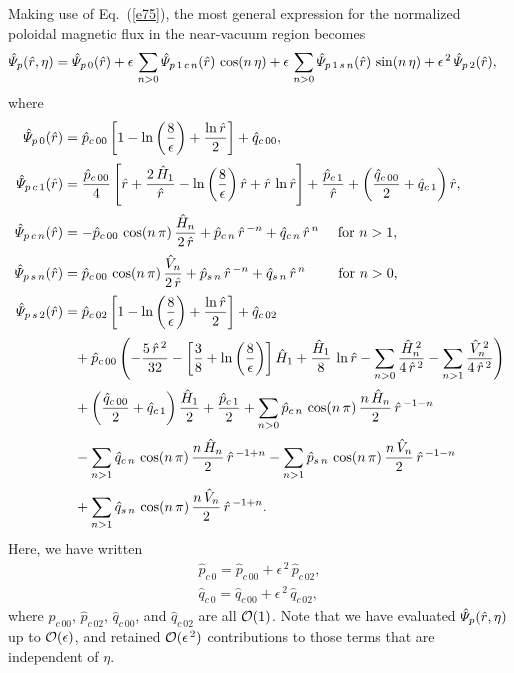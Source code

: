 \documentclass[12pt,prb,aps]{revtex4-1}
\begin{document}
Making use of Eq.~(\ref{e75}), the most general expression for the normalized poloidal magnetic flux in the near-vacuum
region becomes
\begin{align}\label{e87}
\hat{\mit\Psi}_p(\hat{r},\eta)&=\hat{\mit\Psi}_{p\,0}(\hat{r})+\epsilon\,\sum_{n>0}\hat{\mit\Psi}_{p\,1\,c\,n}(\hat{r})\,\cos(n\,\eta)
+\epsilon\,\sum_{n>0}\hat{\mit\Psi}_{p\,1\,s\,n}(\hat{r})\,\sin(n\,\eta)+\epsilon^{\,2}\,\hat{\mit\Psi}_{p\,2}(\hat{r}),
\end{align}
where
\begin{align}
\hat{\mit\Psi}_{p\,0}(\hat{r})&=  \hat{p}_{c\,00}\left[1-\ln\left(\frac{8}{\epsilon}\right)+\frac{\ln\hat{r}}{2}\right]+\hat{q}_{c\,00},\\[0.5ex]
\hat{\mit\Psi}_{p\,c\,1}(\hat{r})&= \frac{\hat{p}_{c\,00}}{4}
\left[\hat{r}+\frac{2\,\hat{H}_1}{\hat{r}}-\ln\left(\frac{8}{\epsilon}\right)\hat{r}+\hat{r}\,\ln\hat{r}\right]
+\frac{\hat{p}_{c\,1}}{\hat{r}}
+\left(\frac{\hat{q}_{c\,00}}{2}+\hat{q}_{c\,1}\right)\hat{r},\\[0.5ex]
\hat{\mit\Psi}_{p\,c\,n} (\hat{r})&=-\hat{p}_{c\,00}\,\cos(n\,\pi)\,\frac{\hat{H}_n}{2\,\hat{r}}+\hat{p}_{c\,n}\,\hat{r}^{\,-n}+\hat{q}_{c\,n}\,\hat{r}^{\,n}~~~~\mbox{for $n>1$},\\[0.5ex]
\hat{\mit\Psi}_{p\,s\,n} (\hat{r})&=\hat{p}_{c\,00}\,\cos(n\,\pi)\,\frac{\hat{V}_n}{2\,\hat{r}}+\hat{p}_{s\,n}\,\hat{r}^{\,-n}+\hat{q}_{s\,n}\,\hat{r}^{\,n}~~~~~~~\mbox{for $n>0$},\\[0.5ex]
\hat{\mit\Psi}_{p\,s\,2}(\hat{r})&= 
 \hat{p}_{c\,02}\left[1-\ln\left(\frac{8}{\epsilon}\right)+\frac{\ln\hat{r}}{2}\right]+\hat{q}_{c\,02}\nonumber\\[0.5ex]
&\phantom{=}+\hat{p}_{c\,00}\left(-\frac{5\,\hat{r}^{\,2}}{32}- \left[\frac{3}{8}+ \ln\left(\frac{8}{\epsilon}\right)\right]\hat{H}_1+\frac{\hat{H}_1}{8}\,\ln\hat{r}
-\sum_{n>0}\frac{\hat{H}_n^{\,2}}{4\,\hat{r}^{\,2}}-\sum_{n>1}\frac{\hat{V}_n^{\,2}}{4\,\hat{r}^{\,2}}\right)\nonumber\\[0.5ex]
&\phantom{=}+\left(\frac{\hat{q}_{c\,00}}{2}+\hat{q}_{c\,1}\right)\frac{\hat{H}_1}{2}  +\frac{\hat{p}_{c\,1}}{2}
 +\sum_{n>0}\hat{p}_{c\,n}\,\cos(n\,\pi)\,\frac{n\,\hat{H}_{n}}{2}\,\hat{r}^{\,-1-n}
\nonumber\\[0.5ex]
 &\phantom{=} -\sum_{n>1}\hat{q}_{c\,n}\,\cos(n\,\pi)\,\frac{n\,\hat{H}_{n}}{2}\,\hat{r}^{\,-1+n}
 -\sum_{n>1}\hat{p}_{s\,n}\,\cos(n\,\pi)\,\frac{n\,\hat{V}_{n}}{2}\,\hat{r}^{\,-1-n}\nonumber\\[0.5ex]
 &\phantom{=} 
 +\sum_{n>1}\hat{q}_{s\,n}\,\cos(n\,\pi)\,\frac{n\,\hat{V}_{n}}{2}\,\hat{r}^{\,-1+n}.\label{e93}
\end{align}
Here, we have written 
\begin{align}
\hat{p}_{c\,0} = \hat{p}_{c\,00}+\epsilon^{\,2}\,\hat{p}_{c\,02},\\[0.5ex]
\hat{q}_{c\,0} = \hat{q}_{c\,00}+\epsilon^{\,2}\,\hat{q}_{c\,02},\label{e94e}
\end{align}
where $\hat{p}_{c\,00}$, $\hat{p}_{c\,02}$, $\hat{q}_{c\,00}$, and $\hat{q}_{c\,02}$ are all ${\cal O}(1)$. 
Note that we have evaluated $\hat{\mit\Psi}_p(\hat{r},\eta)$ up to  ${\cal O}(\epsilon)$, and retained ${\cal O}(\epsilon^{\,2})$
contributions to those terms that are independent of $\eta$. 
\end{document}
